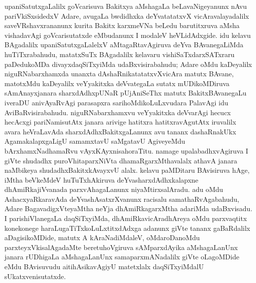 upaniSatutxgaLalilx goVcarisuva Bakitxya aMshagaLa beLavaNigeyanunx nAvu pariVkiSx\-sidedxV Adare, avugaLa bwdidhxka deYvatatatxvX vicAravalayadalilx saveVRshavxrananunx kurita Bakitx karxmeVNa beLedu barutitxruva aMsha vishadavAgi goVcarisutatxde eMbudanunx I modaleV heVLidAdxgide. idu kelavu BAgadalilx upaniSatutxgaLalelxV aMtagaRtavAgiruva deYva BAvanegaLiMda huTiTxrabahudu, matatxSuTx BAgadalilx kelavaru vishiSaTxdarxSATxraru paDedukoMDa divayxdaqSiTxyiMda udaBxvisirabahudu; Adare oMdu kaDeyalilx niguRNabarxhamxda unanxta dAshaRnikatatatxvXvicAra matutx BAvane, matotxMdu kaDeyalilx veYyakitxka deVvategaLa sutatx mUDikoMDiruva sAmAnayxjanara sharxdAdhxpUNaR pUjAniSeThx matutx BakitxBAvanegaLu iveraDU anivAyaRvAgi parasapxra sarihoMdikoLuLxvudara PalavAgi idu AviBaRvisirabahudu. niguRNabarxhamxvu veYyakitxka deVvarAgi hecucx hecAcxgi pariNamisutAtx janara arivige hatitxra hatitxravAgutAtx iruvalilx avara heVraLavAda sharxdAdhxBakitxgaLanunx avu tananx dashaRnakUkx AgamakalapxgaLigU samamxtavU saMgatavU AgiveyeMdu bArxhamxNadhamaRvu vAyxKAyxnisahoraTitu. namage upalabadhxvAgiruva I giVte shudadhx puroVhitaparxNiVta dhamaRgarxMthavalalx athavA janara naMbikeya shudadhxBakitxkAvayxvU alalx. kelavu paMDitaru BAvisiruva hAge, iMtha beVkeMdeV huTuTxhAkiruva deYvasharxdAdhxkalapxne dhAmiRkajiVvanada parxvAhagaLanunx niyaMtirxsalAradu. adu oMdu AshacxyaRkaravAda deYvashAsatxrXvanunx racisalu samathaRvAgabahudu, Adare BagavadigxVteyaMtha neYja dhAmiRkagarxMtha adariMda udaBxvisadu. I parishiVlanegaLa daqSiTxyiMda, dhAmiRkavicAradhAreya oMdu parxvaqtitx konekonege haraLugaTiTxkoLuLxtitxdAdxga adanunx giVte tananx gaBaRdalilx aDagisikoMDide, matutx A kAraNadiMdaleV, oMdaroDanoMdu parxteyxVkisalAgadaMte beretuhoVgiruva sAMparxdAyika aMshagaLanUnx janara rUDhigaLa aMshagaLanUnx samaparxmANadalilx giVte oLagoMDide eMdu BAvisuvudu aitihAsikavAgiyU matetxlalx daqSiTxyiMdalU sUkatxvenisutatxde.

